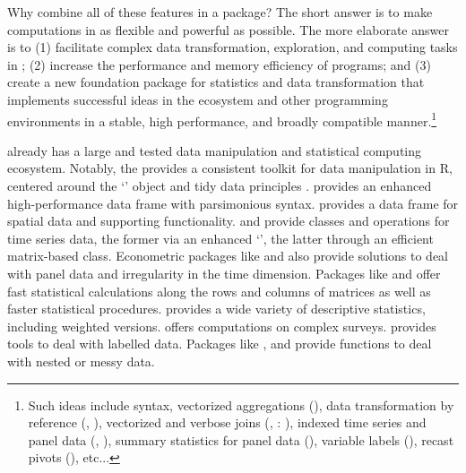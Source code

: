 \documentclass[nojss]{jss} %
\newcommand{\class}[1]{`\code{#1}'}
\begin{document}
Why combine all of these features in a package? The short answer is to make computations in  as flexible and powerful as possible. The more elaborate answer is to (1) facilitate complex data transformation, exploration, and computing tasks in ; (2) increase the performance and memory efficiency of  programs; %
and (3) create a new foundation package for statistics and data transformation that implements successful ideas in the  ecosystem and other programming environments in a stable, high performance, and broadly compatible manner.\footnote{Such ideas include  syntax, vectorized aggregations (), data transformation by reference (, ), vectorized and verbose joins (, : \citet{STATA}), indexed time series and panel data (, ), summary statistics for panel data (), variable labels (), recast pivots (), etc...} \newline

 already has a large and tested data manipulation and statistical computing ecosystem. Notably, the  \citep{rtidyverse} provides a consistent toolkit for data manipulation in R, centered around the \class{tibble} \citep{rtibble} object and tidy data principles \citep{rtidydata}.  \citep{rdatatable} provides an enhanced high-performance data frame with parsimonious syntax.  \citep{rsf} provides a data frame for spatial data and supporting functionality.  \citep{rtsibble} and  \citep{rxts} provide classes and operations for time series data, the former via an enhanced \class{tibble}, the latter through an efficient matrix-based class. Econometric packages like  \citep{rplm} and  \citep{rfixest} also provide solutions to deal with panel data and irregularity in the time dimension. Packages like  \citep{rmatrixstats} and  \citep{rfast} offer fast statistical calculations along the rows and columns of matrices as well as faster statistical procedures.  \citep{rdesctools} provides a wide variety of descriptive statistics, including weighted versions.  \citep{rsurvey} offers computations on complex surveys.  \citep{rlabelled} provides tools to deal with labelled data. Packages like  \citep{rtidyr},  \citep{rpurrr} and  \citep{rrapply} provide functions to deal with nested or messy data. \newline
\end{document}
